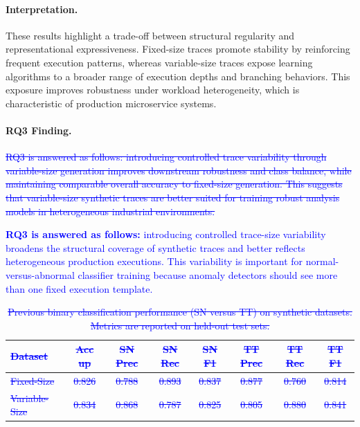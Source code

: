 \documentclass[sigconf,review]{acmart}
\begin{document}
\paragraph{Interpretation.}
These results highlight a trade-off between structural regularity and representational expressiveness. Fixed-size traces promote stability by reinforcing frequent execution patterns, whereas variable-size traces expose learning algorithms to a broader range of execution depths and branching behaviors. This exposure improves robustness under workload heterogeneity, which is characteristic of production microservice systems.

\paragraph{RQ3 Finding.}
\textcolor{blue}{\sout{RQ3 is answered as follows: introducing controlled trace variability through variable-size generation improves downstream robustness and class balance, while maintaining comparable overall accuracy to fixed-size generation. This suggests that variable-size synthetic traces are better suited for training robust analysis models in heterogeneous industrial environments.}}

\textcolor{blue}{\textbf{RQ3 is answered as follows:} introducing controlled trace-size variability broadens the structural coverage of synthetic traces and better reflects heterogeneous production executions. This variability is important for normal-versus-abnormal classifier training because anomaly detectors should see more than one fixed execution template.}

\begin{table}[t]
    \centering
    \begin{tabular}{lccccccc}
    \textcolor{blue}{\sout{Dataset}} & \textcolor{blue}{\sout{Acc up}} &
    \textcolor{blue}{\sout{SN Prec}} & \textcolor{blue}{\sout{SN Rec}} & \textcolor{blue}{\sout{SN F1}} &
    \textcolor{blue}{\sout{TT Prec}} & \textcolor{blue}{\sout{TT Rec}} & \textcolor{blue}{\sout{TT F1}} \\
    \hline
    \textcolor{blue}{\sout{Fixed-Size}}
    & \textcolor{blue}{\sout{0.826}}
    & \textcolor{blue}{\sout{0.788}} & \textcolor{blue}{\sout{0.893}} & \textcolor{blue}{\sout{0.837}}
    & \textcolor{blue}{\sout{0.877}} & \textcolor{blue}{\sout{0.760}} & \textcolor{blue}{\sout{0.814}} \\
    \textcolor{blue}{\sout{Variable-Size}}
    & \textcolor{blue}{\sout{0.834}}
    & \textcolor{blue}{\sout{0.868}} & \textcolor{blue}{\sout{0.787}} & \textcolor{blue}{\sout{0.825}}
    & \textcolor{blue}{\sout{0.805}} & \textcolor{blue}{\sout{0.880}} & \textcolor{blue}{\sout{0.841}} \\
    \end{tabular}
   \caption{\textcolor{blue}{\protect\sout{Previous binary classification performance (SN versus TT) on synthetic datasets. Metrics are reported on held-out test sets.}}}
    \label{tab:old-synthetic-classification}
\end{table}
\end{document}
